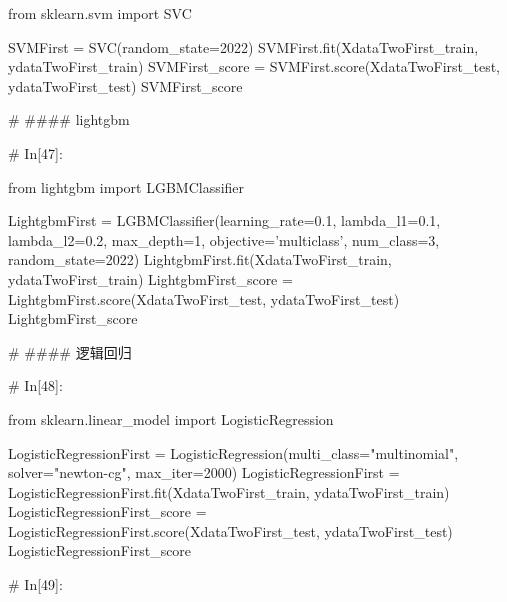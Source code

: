 \documentclass{MathorCupmodeling}
\begin{document}
\begin{python}
	
	from sklearn.svm import SVC
	
	SVMFirst = SVC(random_state=2022)
	SVMFirst.fit(XdataTwoFirst_train, ydataTwoFirst_train)
	SVMFirst_score = SVMFirst.score(XdataTwoFirst_test, ydataTwoFirst_test)
	SVMFirst_score
	
	# #### lightgbm
	
	# In[47]:
	
	
	from lightgbm import LGBMClassifier
	
	LightgbmFirst = LGBMClassifier(learning_rate=0.1,
								   lambda_l1=0.1,
								   lambda_l2=0.2,
								   max_depth=1,
								   objective='multiclass',
								   num_class=3,
								   random_state=2022)
	LightgbmFirst.fit(XdataTwoFirst_train, ydataTwoFirst_train)
	LightgbmFirst_score = LightgbmFirst.score(XdataTwoFirst_test, ydataTwoFirst_test)
	LightgbmFirst_score
	
	# #### 逻辑回归
	
	# In[48]:
	
	
	from sklearn.linear_model import LogisticRegression
	
	LogisticRegressionFirst = LogisticRegression(multi_class="multinomial", solver="newton-cg", max_iter=2000)
	LogisticRegressionFirst = LogisticRegressionFirst.fit(XdataTwoFirst_train, ydataTwoFirst_train)
	LogisticRegressionFirst_score = LogisticRegressionFirst.score(XdataTwoFirst_test, ydataTwoFirst_test)
	LogisticRegressionFirst_score
	
	# In[49]:
	

\end{python}
\end{document}
